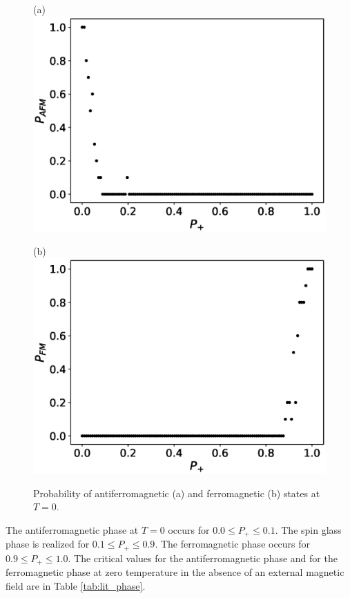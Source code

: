 \documentclass[preprint,12pt]{elsarticle}
\begin{document}
	\begin{figure}[H]
		\begin{minipage}[h]{0.45\linewidth}
			\centering (a)
			\includegraphics[width=1\linewidth]{images/P_AFM_Mmax.eps}
		\end{minipage}
		\hfill
		\begin{minipage}[h]{0.45\linewidth}
			\centering (b)
			\includegraphics[width=1\linewidth]{images/P_FM_Mmax.eps}
		\end{minipage}
		\caption{Probability of antiferromagnetic (a) and ferromagnetic (b) states at \( T = 0 \)\textcolor{red}{.}}
		\label{fig:P_AFM_FM_Mmax}
	\end{figure}
	
	The antiferromagnetic phase at $T = 0$ occurs for $0.0 \leq P_+ \leq 0.1$. The spin glass phase is realized for $0.1 \leq P_+ \leq 0.9$. The ferromagnetic phase occurs for $0.9 \leq P_+ \leq 1.0$. The critical values for the antiferromagnetic phase and for the ferromagnetic phase at zero temperature in the absence of an external magnetic field are in Table \ref{tab:lit_phase}.
	
\end{document}

